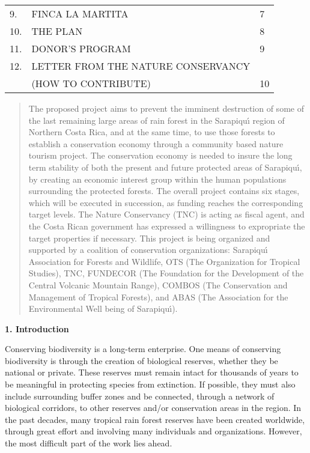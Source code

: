 \begin{center}
\begin{tabular}{lll}
9.  & FINCA LA MARTITA                              & 7\\

10. & THE PLAN                                      & 8\\

11. & DONOR'S PROGRAM                               & 9\\

12. & LETTER FROM THE NATURE CONSERVANCY            & \\
    & (HOW TO CONTRIBUTE)                           & 10\\
\end{tabular}

\end{center}

\begin{abstract}

The proposed project aims to prevent the imminent destruction of
some of the last remaining large areas of rain forest in the
Sarapiqu\'{\i} region of Northern Costa Rica, and at the same time,
to use those forests to establish a conservation economy through a
community based nature tourism project.  The conservation economy is
needed to insure the long term stability of both the present and future
protected areas of Sarapiqu\'{\i}, by creating an economic interest group
within the human populations surrounding the protected forests.  The
overall project contains six stages, which will be executed in succession,
as funding reaches the corresponding target levels.  The Nature Conservancy
(TNC) is acting as fiscal agent, and the Costa Rican government has expressed
a willingness to expropriate the target properties if necessary.  This
project is being organized and supported by a coalition of conservation
organizations: Sarapiqu\'{\i} Association for Forests and Wildlife,
OTS (The Organization for Tropical Studies), TNC, FUNDECOR (The Foundation
for the Development of the Central Volcanic Mountain Range), COMBOS (The
Conservation and Management of Tropical Forests), and ABAS (The Association
for the Environmental Well being of Sarapiqu\'{\i}).

\end{abstract}

\pagebreak

\LP
{\large {\bf 1. Introduction}}
\eLP

Conserving biodiversity is a long-term enterprise.  One means of
conserving biodiversity is through the creation of biological
reserves, whether they be national or private.  These reserves must
remain intact for thousands of years to be meaningful in protecting
species from extinction.  If possible, they must also include
surrounding buffer zones and be connected, through a network of
biological corridors, to other reserves and/or conservation areas
in the region.  In the past decades, many tropical rain forest
reserves have been created worldwide, through great effort and
involving many individuals and organizations.  However, the most
difficult part of the work lies ahead.

